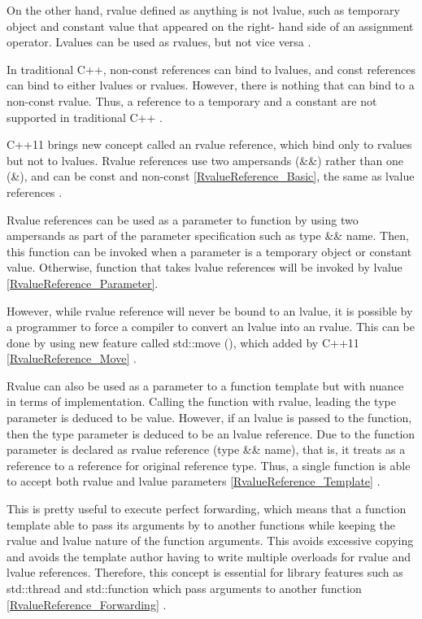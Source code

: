 \documentclass[11pt]{report}
\begin{document}
On the other hand, rvalue defined as anything is not lvalue, such as temporary object and constant value that appeared on the right- hand side of an assignment operator.  Lvalues can be used as rvalues, but not vice versa \cite{Gregorie:professionalcpp}.


In traditional C++, non-const references can bind to lvalues, and const references can bind to either lvalues or rvalues. However, there is nothing that can bind to a non-const rvalue. Thus, a reference to a temporary and a constant are not supported in traditional C++ \cite{Stroustrup:2012:Cpp11}.


C++11 brings new concept called an rvalue reference, which bind only to rvalues but not to lvalues. Rvalue references use two ampersands (\&\&) rather than one (\&), and can be const and non-const \ref{RvalueReference_Basic}, the same as lvalue references \cite{Gregorie:professionalcpp}.


Rvalue references can be used as a parameter to function by using two ampersands as part of the parameter specification such as type \&\& name. Then, this function can be invoked when a parameter is a temporary object or constant value. Otherwise, function that takes lvalue references will be invoked by lvalue \ref{RvalueReference_Parameter}.


However, while rvalue reference will never be bound to an lvalue, it is possible by a programmer to force a compiler to convert an lvalue into an rvalue. This can be done by using new feature called std::move (), which added by C++11 \ref{RvalueReference_Move} \cite{Gregorie:professionalcpp}.


Rvalue can also be used as a parameter to a function template but with nuance in terms of implementation. Calling the function with rvalue, leading the type parameter is deduced to be value. However, if an lvalue is passed to the function, then the type parameter is deduced to be an lvalue reference. Due to the function parameter is declared as rvalue reference (type \&\& name), that is, it treats as a reference to a reference for original reference type. Thus, a single function is able to accept both rvalue and lvalue parameters \ref{RvalueReference_Template} \cite{Williams:2012:CCA}.


This is pretty useful to execute perfect forwarding, which means that a function template able to pass its arguments by to another functions while keeping the rvalue and lvalue nature of the function arguments.  This avoids excessive copying and avoids the template author having to write multiple overloads for rvalue and lvalue references. Therefore, this concept is essential for library features such as std::thread and std::function which pass arguments to another function \ref{RvalueReference_Forwarding} \cite{Williams:2012:CCA}.
\end{document}
